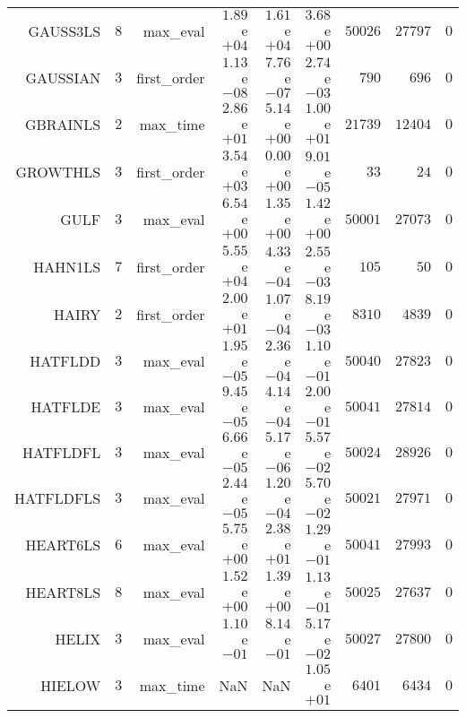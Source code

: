 \begin{longtable}{rrrrrrrrr}
GAUSS3LS & \(     8\) & max\_eval & \( 1.89\)e\(+04\) & \( 1.61\)e\(+04\) & \( 3.68\)e\(+00\) & \( 50026\) & \( 27797\) & \(     0\) \\
GAUSSIAN & \(     3\) & first\_order & \( 1.13\)e\(-08\) & \( 7.76\)e\(-07\) & \( 2.74\)e\(-03\) & \(   790\) & \(   696\) & \(     0\) \\
GBRAINLS & \(     2\) & max\_time & \( 2.86\)e\(+01\) & \( 5.14\)e\(+00\) & \( 1.00\)e\(+01\) & \( 21739\) & \( 12404\) & \(     0\) \\
GROWTHLS & \(     3\) & first\_order & \( 3.54\)e\(+03\) & \( 0.00\)e\(+00\) & \( 9.01\)e\(-05\) & \(    33\) & \(    24\) & \(     0\) \\
GULF & \(     3\) & max\_eval & \( 6.54\)e\(+00\) & \( 1.35\)e\(+00\) & \( 1.42\)e\(+00\) & \( 50001\) & \( 27073\) & \(     0\) \\
HAHN1LS & \(     7\) & first\_order & \( 5.55\)e\(+04\) & \( 4.33\)e\(-04\) & \( 2.55\)e\(-03\) & \(   105\) & \(    50\) & \(     0\) \\
HAIRY & \(     2\) & first\_order & \( 2.00\)e\(+01\) & \( 1.07\)e\(-04\) & \( 8.19\)e\(-03\) & \(  8310\) & \(  4839\) & \(     0\) \\
HATFLDD & \(     3\) & max\_eval & \( 1.95\)e\(-05\) & \( 2.36\)e\(-04\) & \( 1.10\)e\(-01\) & \( 50040\) & \( 27823\) & \(     0\) \\
HATFLDE & \(     3\) & max\_eval & \( 9.45\)e\(-05\) & \( 4.14\)e\(-04\) & \( 2.00\)e\(-01\) & \( 50041\) & \( 27814\) & \(     0\) \\
HATFLDFL & \(     3\) & max\_eval & \( 6.66\)e\(-05\) & \( 5.17\)e\(-06\) & \( 5.57\)e\(-02\) & \( 50024\) & \( 28926\) & \(     0\) \\
HATFLDFLS & \(     3\) & max\_eval & \( 2.44\)e\(-05\) & \( 1.20\)e\(-04\) & \( 5.70\)e\(-02\) & \( 50021\) & \( 27971\) & \(     0\) \\
HEART6LS & \(     6\) & max\_eval & \( 5.75\)e\(+00\) & \( 2.38\)e\(+01\) & \( 1.29\)e\(-01\) & \( 50041\) & \( 27993\) & \(     0\) \\
HEART8LS & \(     8\) & max\_eval & \( 1.52\)e\(+00\) & \( 1.39\)e\(+00\) & \( 1.13\)e\(-01\) & \( 50025\) & \( 27637\) & \(     0\) \\
HELIX & \(     3\) & max\_eval & \( 1.10\)e\(-01\) & \( 8.14\)e\(-01\) & \( 5.17\)e\(-02\) & \( 50027\) & \( 27800\) & \(     0\) \\
HIELOW & \(     3\) & max\_time &       NaN &       NaN & \( 1.05\)e\(+01\) & \(  6401\) & \(  6434\) & \(     0\) \\

\end{longtable}
